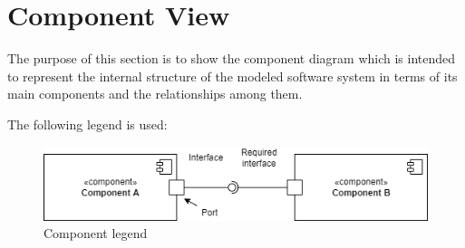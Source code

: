 \section{Component View}
The purpose of this section is to show the component diagram which is intended to represent the internal structure of the modeled software system in terms of its main components and the relationships among them.

The following legend is used:
\begin{center}
    \begin{figure}[h!]
  \includegraphics[width=\textwidth,height=\textheight,keepaspectratio]{./Images/ComponentLegenda.png}
  \caption{Component legend}
\end{figure}
\end{center}


